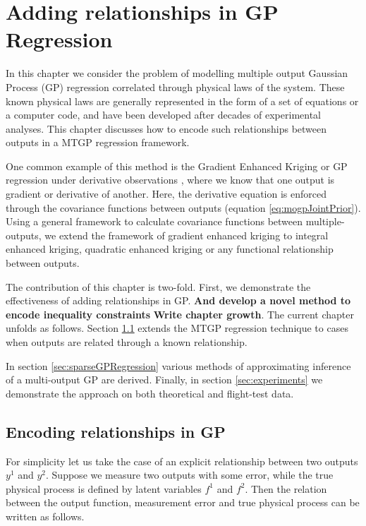 \chapter{Adding relationships in GP Regression}
\label{chapAddingEquationsInGP}
In this chapter we consider the problem of modelling multiple output Gaussian Process (GP) regression correlated through physical laws of the system. These known physical laws are generally represented in the form of a set of equations or a computer code, and have been developed after decades of experimental analyses. This chapter discusses how to encode such relationships between outputs in a MTGP regression framework. 

One common example of this method is the Gradient Enhanced Kriging \cite{chung2002using, morris1993bayesian, forrester2009recent} or GP regression under derivative observations \cite{NIPSDerivativeGP}, where we know that one output is gradient or derivative of another. Here, the derivative equation is enforced through the covariance functions between outputs (equation \ref{eq:mogpJointPrior}). Using a general framework \cite{Constantinescu2013} to calculate covariance functions between multiple-outputs, we extend the framework of gradient enhanced kriging to integral enhanced kriging, quadratic enhanced kriging or any functional relationship between outputs.  

The contribution of this chapter is two-fold. First, we demonstrate the effectiveness of adding relationships in GP. \textbf{And develop a novel method to encode inequality constraints}
\textbf{Write chapter growth}. The current chapter unfolds as follows. Section \ref{secEncodingRelationships} extends the MTGP regression technique to cases when outputs are related through a known relationship. 

In section \ref{sec:sparseGPRegression} various methods of approximating inference of a multi-output GP are derived. Finally, in section \ref{sec:experiments} we demonstrate the approach on both theoretical and flight-test data.

\section{Encoding relationships in GP}\label{secEncodingRelationships}
For simplicity let us take the case of an explicit relationship between two outputs \(y^{1}\) and \(y^{2}\). Suppose we measure two outputs with some error, while the true physical process is defined by latent variables \(f^{1}\) and \(f^{2}\). Then the relation between the output function, measurement error and true physical process can be written as follows. 

